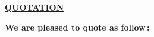 \documentclass[9pt,a4paper,landscape]{article}
\begin{document}
\vspace{0.5cm}
\begin{center}
  {\large\bfseries\underline{QUOTATION}}
\end{center}
\vspace{0.1cm}

\noindent\textbf{We are pleased to quote as follow\,:}

\vspace{0.3cm}


\setlength{\tabcolsep}{3pt}
\end{document}
